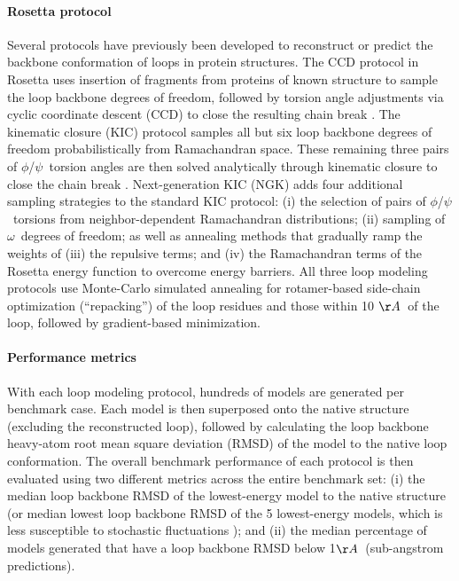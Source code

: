 \paragraph{Rosetta protocol}

Several protocols have previously been developed to reconstruct or predict the backbone conformation of loops in protein structures. The CCD protocol in Rosetta \cite{wang_proteinprotein_2007} uses insertion of fragments from proteins of known structure to sample the loop backbone degrees of freedom, followed by torsion angle adjustments via cyclic coordinate descent (CCD) to close the resulting chain break \cite{canutescu_cyclic_2003}. The kinematic closure (KIC) protocol \cite{mandell_sub-angstrom_2009} samples all but six loop backbone degrees of freedom probabilistically from Ramachandran space. These remaining three pairs of $\phi$/$\psi$\ torsion angles are then solved analytically through kinematic closure to close the chain break \cite{coutsias_kinematic_2004}. Next-generation KIC (NGK) \cite{stein_improvements_2013} adds four additional sampling strategies to the standard KIC protocol: (i) the selection of pairs of $\phi$/$\psi$\ torsions from neighbor-dependent Ramachandran distributions; (ii) sampling of $\omega$\ degrees of freedom; as well as annealing methods that gradually ramp the weights of (iii) the repulsive terms; and (iv) the Ramachandran terms of the Rosetta energy function to overcome energy barriers. All three loop modeling protocols use Monte-Carlo simulated annealing for rotamer-based side-chain optimization (``repacking'') of the loop residues and those within 10 $\AA$\ of the loop, followed by gradient-based minimization.
\paragraph{Performance metrics}
With each loop modeling protocol, hundreds of models are generated per benchmark case. Each model is then superposed onto the native structure (excluding the reconstructed loop), followed by calculating the loop backbone heavy-atom root mean square deviation (RMSD) of the model to the native loop conformation. The overall benchmark performance of each protocol is then evaluated using two different metrics across the entire benchmark set: (i) the median loop backbone RMSD of the lowest-energy model to the native structure (or median lowest loop backbone RMSD of the 5 lowest-energy models, which is less susceptible to stochastic fluctuations \cite{leaver-fay_chapter_2013}); and (ii) the median percentage of models generated that have a loop backbone RMSD below 1$\AA$\ (sub-angstrom predictions).

